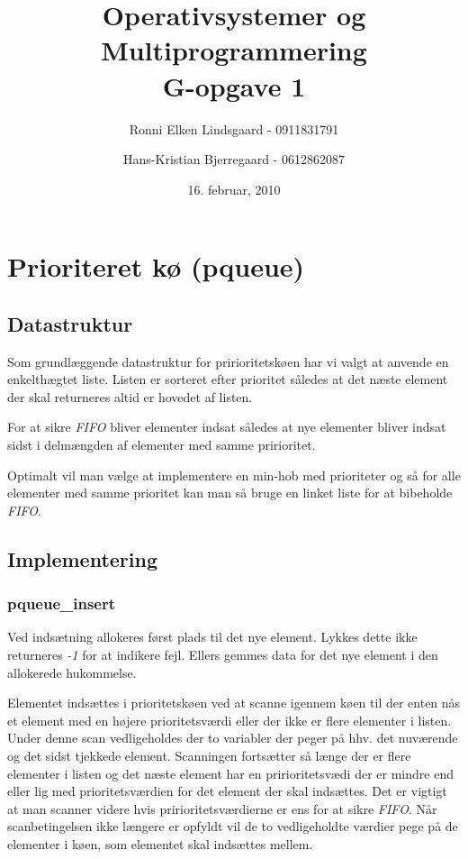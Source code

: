 \documentclass[titlepage]{article}
\title{Operativsystemer og Multiprogrammering\\G-opgave 1}
\author{Ronni Elken Lindsgaard - 0911831791 \and
Hans-Kristian Bjerregaard - 0612862087}
\date{16. februar, 2010}
\begin{document}
\maketitle
\newpage
\section{Prioriteret kø (pqueue)}
  \subsection{Datastruktur}
    Som grundlæggende datastruktur for pririoritetskøen har vi valgt at anvende en enkelthægtet liste.
    Listen er sorteret efter prioritet således at det næste element der skal returneres altid er hovedet af listen.

    For at sikre {\it FIFO} bliver elementer indsat således at nye elementer bliver indsat sidst i delmængden af elementer med samme pririoritet.

    Optimalt vil man vælge at implementere en min-hob med prioriteter og så for alle elementer med samme prioritet kan man så bruge en linket liste for at bibeholde {\it FIFO}.

  \subsection{Implementering}
    \subsubsection{pqueue\_insert}
      Ved indsætning allokeres først plads til det nye element.
      Lykkes dette ikke returneres {\it -1} for at indikere fejl.
      Ellers gemmes data for det nye element i den allokerede hukommelse.

      Elementet indsættes i prioritetskøen ved at scanne igennem køen til der enten nås et element med en højere prioritetsværdi eller der ikke er flere elementer i listen.
      Under denne scan vedligeholdes der to variabler der peger på hhv. det nuværende og det sidst tjekkede element.
      Scanningen fortsætter så længe der er flere elementer i listen og det næste element har en pririoritetsvædi der er mindre end eller lig med prioritetsværdien for det element der skal indsættes.
      Det er vigtigt at man scanner videre hvis pririoritetsværdierne er ens for at sikre {\it FIFO}.
      Når scanbetingelsen ikke længere er opfyldt vil de to vedligeholdte værdier pege på de elementer i køen, som elementet skal indsættes mellem.
\end{document}
